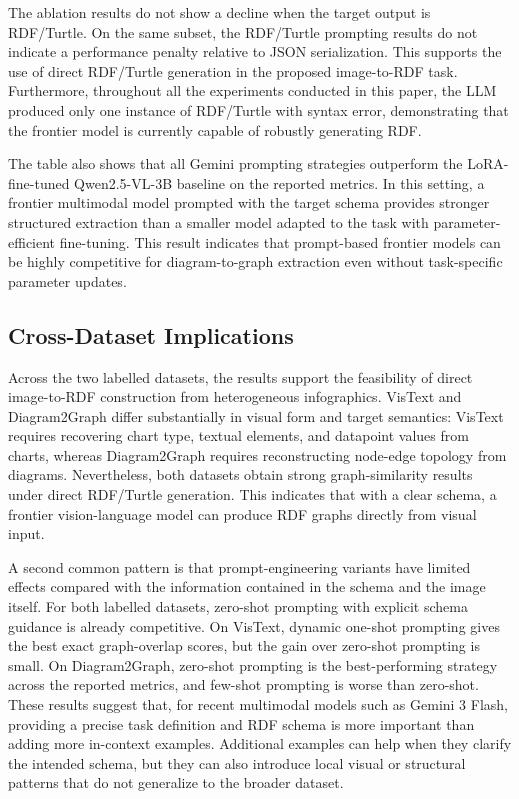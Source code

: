 \documentclass[preprint,12pt]{elsarticle}
\begin{document}
The ablation results do not show a decline when the target output is RDF/Turtle. On the same subset, the RDF/Turtle prompting results do not indicate a performance penalty relative to JSON serialization. This supports the use of direct RDF/Turtle generation in the proposed image-to-RDF task. Furthermore, throughout all the experiments conducted in this paper, the LLM produced only one instance of RDF/Turtle with syntax error, demonstrating that the frontier model is currently capable of robustly generating RDF.

The table also shows that all Gemini prompting strategies outperform the LoRA-fine-tuned Qwen2.5-VL-3B baseline on the reported metrics. In this setting, a frontier multimodal model prompted with the target schema provides stronger structured extraction than a smaller model adapted to the task with parameter-efficient fine-tuning. This result indicates that prompt-based frontier models can be highly competitive for diagram-to-graph extraction even without task-specific parameter updates.

\subsection{Cross-Dataset Implications}

Across the two labelled datasets, the results support the feasibility of direct
image-to-RDF construction from heterogeneous infographics. VisText and
Diagram2Graph differ substantially in visual form and target semantics: VisText
requires recovering chart type, textual elements, and datapoint values from
charts, whereas Diagram2Graph requires reconstructing node-edge topology from
diagrams. Nevertheless, both datasets obtain strong graph-similarity results
under direct RDF/Turtle generation. This indicates that with a clear schema, a frontier vision-language model can
produce RDF graphs directly from visual input.

A second common pattern is that prompt-engineering variants have limited
effects compared with the information contained in the schema and the image
itself. For both labelled datasets, zero-shot prompting with explicit schema
guidance is already competitive. On VisText, dynamic one-shot prompting gives
the best exact graph-overlap scores, but the gain over zero-shot prompting is
small. On Diagram2Graph, zero-shot prompting is the best-performing strategy
across the reported metrics, and few-shot prompting is worse than zero-shot.
These results suggest that, for recent multimodal models such as Gemini 3
Flash, providing a precise task definition and RDF schema is more important than
adding more in-context examples. Additional examples can help when they clarify
the intended schema, but they can also introduce local visual or structural
patterns that do not generalize to the broader dataset.
\end{document}
